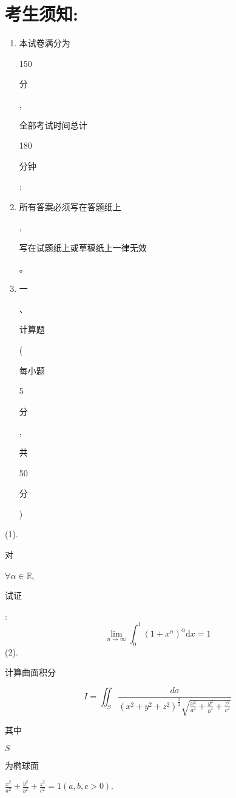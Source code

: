 \documentclass[10pt]{article}
\begin{document}
\section{考生须知:}
\begin{enumerate}
  \item \begin{CJK}{UTF8}{mj}本试卷满分为\end{CJK} 150 \begin{CJK}{UTF8}{mj}分\end{CJK}, \begin{CJK}{UTF8}{mj}全部考试时间总计\end{CJK} 180 \begin{CJK}{UTF8}{mj}分钟\end{CJK};

  \item \begin{CJK}{UTF8}{mj}所有答案必须写在答题纸上\end{CJK}, \begin{CJK}{UTF8}{mj}写在试题纸上或草稿纸上一律无效\end{CJK}。

  \item \begin{CJK}{UTF8}{mj}一\end{CJK}、\begin{CJK}{UTF8}{mj}计算题\end{CJK} (\begin{CJK}{UTF8}{mj}每小题\end{CJK} 5 \begin{CJK}{UTF8}{mj}分\end{CJK}, \begin{CJK}{UTF8}{mj}共\end{CJK} 50 \begin{CJK}{UTF8}{mj}分\end{CJK})

\end{enumerate}
(1). \begin{CJK}{UTF8}{mj}对\end{CJK} $\forall \alpha \in \mathbb{R}$, \begin{CJK}{UTF8}{mj}试证\end{CJK}:
$$
\lim _{n \rightarrow \infty} \int_{0}^{1}\left(1+x^{n}\right)^{\alpha} \mathrm{d} x=1
$$
(2). \begin{CJK}{UTF8}{mj}计算曲面积分\end{CJK}
$$
I=\iint_{S} \frac{d \sigma}{\left(x^{2}+y^{2}+z^{2}\right)^{\frac{3}{2}} \sqrt{\frac{x^{2}}{a^{4}}+\frac{y^{2}}{b^{4}}+\frac{z^{2}}{c^{4}}}}
$$
\begin{CJK}{UTF8}{mj}其中\end{CJK} $S$ \begin{CJK}{UTF8}{mj}为椭球面\end{CJK} $\frac{x^{2}}{a^{2}}+\frac{y^{2}}{b^{2}}+\frac{z^{2}}{c^{2}}=1(a, b, c>0)$.
\end{document}
